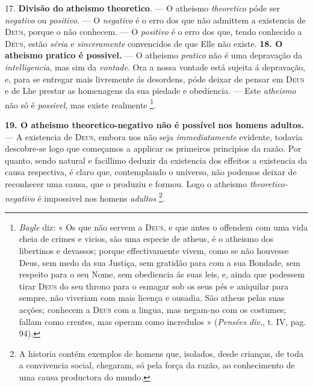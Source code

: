 17. \textbf{Divisão do atheismo theoretico}. --- O atheismo \emph{theoretico} póde ser \emph{negativo} ou \emph{positivo}. --- O \emph{negativo} é o erro dos que não admittem a existencia de \textsc{Deus}, porque o não conhecem. --- O \emph{positivo} é o erro dos que, tendo conhecido a \textsc{Deus}, estão \emph{séria} e \emph{sinceramente} convencidos de que Elle não existe.
 \textbf{18. O atheismo pratico é possivel.} --- O atheismo \emph{pratico} não é uma depravação da \emph{intelligencia}, mas sim da \emph{vontade}. Ora a nossa vontade está sujeita á depravação, e, para se entregar mais livremente ás desordens, póde deixar de pensar em \textsc{Deus} e de Lhe prestar as homenagens da sua piedade e obediencia. --- Este \emph{atheismo} não só é \emph{possivel}, mas existe realmente \footnote{\emph{Bayle} diz: « Os que não servem a \textsc{Deus}, e que antes o offendem com uma vida cheia de crimes e vicios, são uma especie de atheus, é o atheismo dos libertinos e devassos; porque effectivamente vivem, como se não houvesse Deus, sem medo da sua Justiça, sem gratidão para com a sua Bondade, sem respeito para o seu Nome, sem obediencia ás suas leis, e, ainda que podessem tirar \textsc{Deus} do seu throno para o esmagar sob os seus pés e aniquilar para sempre, não viveriam com mais licença e ousadia. São atheus pelas suas acções; conhecem a \textsc{Deus} com a lingua, mas negam-no com os costumes; fallam como crentes, mas operam como incredulos » (\emph{Pensées div.}, t. IV, pag. 94).}.

\textbf{19. O atheismo theoretico-negativo não é possível nos homens adultos.} --- A existencia de \textsc{Deus}, embora nos não seja \emph{immediatamente} evidente, todavia descobre-se logo que começamos a applicar os primeiros principios da razão. Por quanto, sendo natural e facillimo deduzir da existencia dos effeitos a existencia da causa respectiva, é claro que, contemplando o universo, não podemos deixar de reconhecer uma causa, que o produziu e formou. Logo o atheismo \emph{theoretico-negativo} é impossivel nos homens \emph{adultos} \footnote{A historia contém exemplos de homens que, isolados, desde crianças, de toda a convivencia social, chegaram, só pela força da razão, ao conhecimento de uma causa productora do mundo.}.

